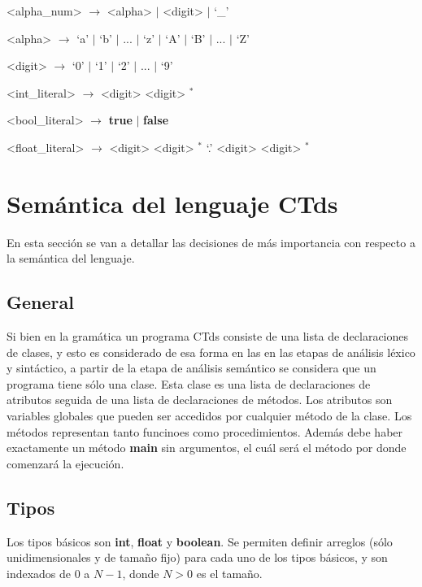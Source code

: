 \documentclass[11pt,a4paper]{article}
\begin{document}
\begin{grammar}
<alpha_num> $\rightarrow$ <alpha> $\mid$ <digit> $\mid$ `_'

<alpha> $\rightarrow$ `a' $\mid$ `b' $\mid$ ... $\mid$ `z' $\mid$ `A' $\mid$ `B' $\mid$ ... $\mid$ `Z'

<digit> $\rightarrow$ `0' $\mid$ `1' $\mid$ `2' $\mid$ ... $\mid$ `9'

<int_literal> $\rightarrow$ <digit> <digit> $^{*}$

<bool_literal> $\rightarrow$ \textbf{true} $\mid$ \textbf{false}

<float_literal> $\rightarrow$ <digit> <digit> $^{*}$ `.' <digit> <digit> $^{*}$

\end{grammar}

\section{Semántica del lenguaje CTds}
\label{sec:semanticactds}

En esta sección se van a detallar las decisiones de más importancia con respecto a la semántica del lenguaje.

\subsection{General}
\label{subsec:general}

Si bien en la gramática un programa CTds consiste de una lista de declaraciones de clases, y esto es considerado de esa forma en las en las etapas de análisis léxico y sintáctico, a partir de la etapa de análisis semántico se considera que un programa tiene sólo una clase. Esta clase es una lista de declaraciones de atributos seguida de una lista de declaraciones de métodos. Los atributos son variables globales que pueden ser accedidos por cualquier método de la clase. Los métodos representan tanto funcinoes como procedimientos. Además debe haber exactamente un método \textbf{main} sin argumentos, el cuál será el método por donde comenzará la ejecución.

\subsection{Tipos}

Los tipos básicos son \textbf{int}, \textbf{float} y \textbf{boolean}. Se permiten definir arreglos (sólo unidimensionales y de tamaño fijo) para cada uno de los tipos básicos, y son indexados de $0$ a $N-1$, donde $N>0$ es el tamaño. 
\end{document}
